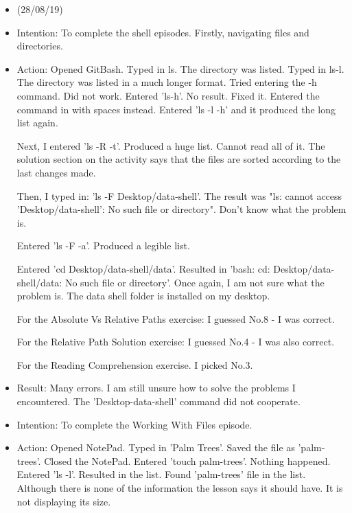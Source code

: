 \documentclass[a4paper,12pt]{article}
\begin{document}
\begin{itemize}
    \item 

(28/08/19)

\item Intention: To complete the shell episodes. Firstly, navigating files and directories. 

\item Action: Opened GitBash. Typed in ls. The directory was listed. Typed in ls-l. The directory was listed in a much longer format. Tried entering the -h command. Did not work. Entered 'ls-h'. No result. Fixed it. Entered the command in with spaces instead. Entered 'ls -l -h' and it produced the long list again. 

Next, I entered 'ls -R -t'. Produced a huge list. Cannot read all of it. The solution section on the activity says that the files are sorted according to the last changes made. 

Then, I typed in: 'ls -F Desktop/data-shell'. The result was "ls: cannot access 'Desktop/data-shell': No such file or directory". Don't know what the problem is. 

Entered 'ls -F -a'. Produced a legible list. 

Entered 'cd Desktop/data-shell/data'. Resulted in 'bash: cd: Desktop/data-shell/data: No such file or directory'. Once again, I am not sure what the problem is. The data shell folder is installed on my desktop.

For the Absolute Vs Relative Paths exercise: I guessed No.8 - I was correct.

For the Relative Path Solution exercise: I guessed No.4 - I was also correct. 

For the Reading Comprehension exercise. I picked No.3.

\item Result: Many errors. I am still unsure how to solve the problems I encountered. The 'Desktop-data-shell' command did not cooperate.

\item Intention: To complete the Working With Files episode. 

\item Action: Opened NotePad. Typed in 'Palm Trees'. Saved the file as 'palm-trees'. Closed the NotePad. Entered 'touch palm-trees'. Nothing happened. Entered 'ls -l'. Resulted in the list. Found 'palm-trees' file in the list. Although there is none of the information the lesson says it should have. It is not displaying its size. 


\end{itemize}
\end{document}
